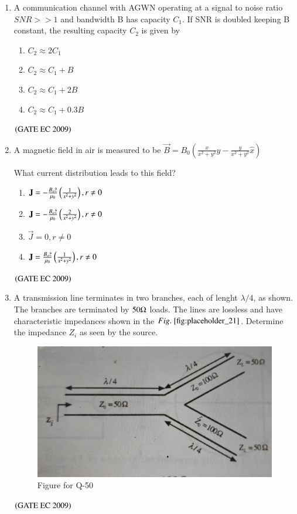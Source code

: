 \documentclass[journal,12pt,onecolumn]{IEEEtran}
\theoremstyle{remark}
\begin{document}
\begin{enumerate}[start=1, label={Q\arabic*.}]
\item A communication channel with AGWN operating at a signal to noise ratio $SNR>>1$ and bandwidth B has capacity $C_1$. If SNR is doubled keeping B constant, the resulting capacity $C_2$ is given by 
\begin{enumerate}
        \item $C_2 \approx 2 C_1$
        \item $C_2 \approx  C_1+B$
        \item $C_2 \approx  C_1 + 2B$
        \item $C_2 \approx  C_1+ 0.3B$
\end{enumerate}
\hfill $\left(\text{GATE EC 2009}\right)$

\item A magnetic field in air is measured to be $\vec{B} = B_0(\frac{x}{x^2+y^2} \hat{y} - \frac{y}{x^2+y^2} \hat{x})$

What current distribution leads to this field? 
\begin{enumerate}
        \item $\mathbf{J}= -\frac{B_o \hat{z}}{\mu_0} \left( \frac{1}{x^2 + y^2}\right), r \neq 0$
        \item $\mathbf{J}= -\frac{B_o \hat{z}}{\mu_0} \left( \frac{2}{x^2 + y^2}\right), r \neq 0$
        \item $\vec{J}= 0, r\neq 0$
        \item $\mathbf{J}= \frac{B_o \hat{z}}{\mu_0} \left( \frac{1}{x^2 + y^2}\right), r \neq 0$
\end{enumerate}
\hfill $\left(\text{GATE EC 2009}\right)$

\item A transmission line terminates in two branches, each of lenght $\lambda/4$, as shown. The branches are terminated by $50 \ohm$ loads. The lines are lossless and have characteristic impedances shown in the $\figref{fig:placeholder_21}$. Determine the impedance $Z_i$ as seen by the source.
\begin{figure}[H]
    \centering
    \includegraphics[width=0.5\columnwidth]{figs/img_21.jpg}
    \caption{Figure for Q-50}
    \label{fig:placeholder_20}
\end{figure}
\begin{enumerate}
\end{enumerate}
\hfill $\left(\text{GATE EC 2009}\right)$


\end{enumerate}
\end{document}
